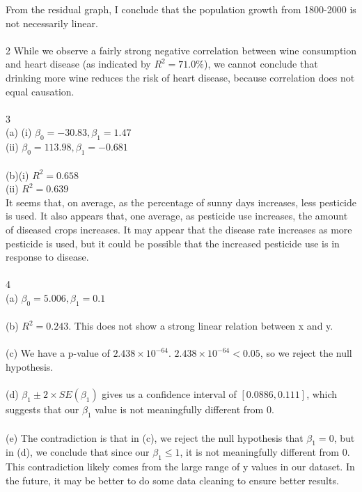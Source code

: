 \documentclass[12pt, letterpaper]{report}
\newcommand\tab[1][1cm]{\hspace*{#1}}
\begin{document}
From the residual graph, I conclude that the population growth from 1800-2000 is not necessarily linear.
\\\\
2 While we observe a fairly strong negative correlation between wine consumption and heart disease (as indicated by $R^2 = 71.0\%$), we cannot conclude that drinking more wine reduces the risk of heart disease, because correlation does not equal causation.\\
\\
3\\
\indent (a) (i) $\beta_0 = -30.83, \beta_1 = 1.47$\\
\tab (ii) $\beta_0 = 113.98, \beta_1 = -0.681$\\
\\
\indent (b)(i) $R^2 = 0.658$\\
\tab (ii) $R^2 = 0.639$\\
It seems that, on average, as the percentage of sunny days increases, less pesticide is used. It also appears that, one average, as pesticide use increases, the amount of diseased crops increases. It may appear that the disease rate increases as more pesticide is used, but it could be possible that the increased pesticide use is in response to disease.
\\\\
4\\
\indent (a) $\beta_0 = 5.006, \beta_1 = 0.1$
\\\\
\indent (b) $R^2 = 0.243$. This does not show a strong linear relation between x and y.
\\\\
\indent (c) We have a p-value of $2.438 \times 10^{-64}$. $2.438 \times 10^{-64} < 0.05$, so we reject the null hypothesis.
\\\\
\indent (d) $\beta_1 \pm 2 \times SE(\beta_1)$ gives us a confidence interval of $[0.0886, 0.111]$, which suggests that our $\beta_1$ value is not meaningfully different from 0.
\\\\
\indent (e) The contradiction is that in (c), we reject the null hypothesis that $\beta_1 = 0$, but in (d), we conclude that since our $\beta_1 \leq 1$, it is not meaningfully different from 0. This contradiction likely comes from the large range of y values in our dataset. In the future, it may be better to do some data cleaning to ensure better results.
\\\\
\end{document}
